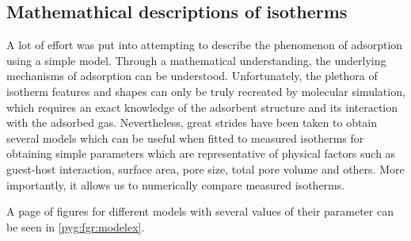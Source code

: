 
\subsection{Mathemathical descriptions of isotherms}%
\label{pyg:models}

A lot of effort was put into attempting to describe
the phenomenon of adsorption using a simple model.
Through a mathematical understanding, the underlying
mechanisms of adsorption can be understood.
Unfortunately, the plethora of isotherm
features and shapes can only be truly recreated
by molecular simulation, which requires an exact
knowledge of the adsorbent structure and its interaction
with the adsorbed gas.
Nevertheless, great strides have been taken to
obtain several models which can be useful
when fitted to measured isotherms
for obtaining simple parameters which are
representative of physical factors such as
guest-host interaction, surface area, pore size,
total pore volume and others.
More importantly, it allows us to numerically
compare measured isotherms.

A page of figures for different models with several
values of their parameter can be seen in
\autoref{pyg:fgr:modelex}.


